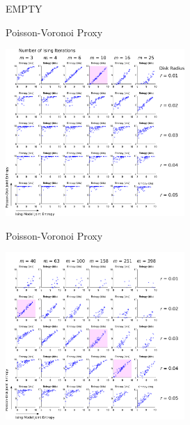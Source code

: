 \documentclass[handout]{beamer}
\begin{document}
\begin{tframe}{EMPTY}
\end{tframe}

\begin{tframe}{Poisson-Voronoi Proxy}
\begin{center}
\includegraphics[height=2.5in]{media_exploration/left_combos_hilite}
\end{center}
\end{tframe}

\begin{tframe}{Poisson-Voronoi Proxy}
\begin{center}
\includegraphics[height=2.5in]{media_exploration/right_combos_hilite}
\end{center}
\end{tframe}
\end{document}
